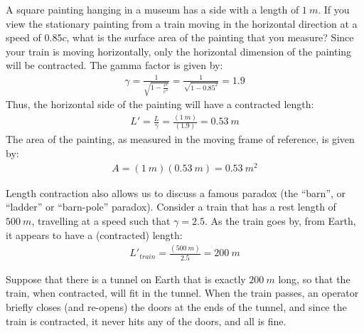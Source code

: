 \begin{example}{A square painting hanging in a museum has a side with a length of $\SI{1}{m}$. If you view the stationary painting from a train moving in the horizontal direction at a speed of $0.85c$, what is the surface area of the painting that you measure?}
Since your train is moving horizontally, only the horizontal dimension of the painting will be contracted. The gamma factor is given by:
\begin{align*}
\gamma = \frac{1}{\sqrt{1-\frac{v^2}{c^2}}} =\frac{1}{\sqrt{1-0.85^2}}=1.9
\end{align*}
Thus, the horizontal side of the painting will have a contracted length:
\begin{align*}
L'=\frac{L}{\gamma}=\frac{(\SI{1}{m})}{(1.9)}=\SI{0.53}{m}
\end{align*}
The area of the painting, as measured in the moving frame of reference, is given by:
\begin{align*}
A= (\SI{1}{m})(\SI{0.53}{m})=\SI{0.53}{m^2}
\end{align*}
\end{example}
Length contraction also allows us to discuss a famous paradox (the ``barn'', or ``ladder'' or ``barn-pole'' paradox). Consider a train that has a rest length of $\SI{500}{m}$, travelling at a speed such that $\gamma = 2.5$. As the train goes by, from Earth, it appears to have a (contracted) length:
\begin{align*}
L'_{train}=\frac{(\SI{500}{m})}{2.5}=\SI{200}{m}
\end{align*}


Suppose that there is a tunnel on Earth that is exactly $\SI{200}{m}$ long, so that the train, when contracted, will fit in the tunnel. When the train passes, an operator briefly closes (and re-opens) the doors at the ends of the tunnel, and since the train is contracted, it never hits any of the doors, and all is fine.

